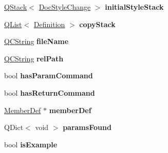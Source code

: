 \begin{DoxyCompactItemize}
\item 
\hypertarget{struct_doc_parser_context_a05ee42b5a2c71142a36b172990976463}{\hyperlink{class_q_stack}{Q\-Stack}$<$ \hyperlink{class_doc_style_change}{Doc\-Style\-Change} $>$ {\bfseries initial\-Style\-Stack}}\label{struct_doc_parser_context_a05ee42b5a2c71142a36b172990976463}

\item 
\hypertarget{struct_doc_parser_context_a1aa0a49fb3b22bcd21ea0482070a2b93}{\hyperlink{class_q_list}{Q\-List}$<$ \hyperlink{class_definition}{Definition} $>$ {\bfseries copy\-Stack}}\label{struct_doc_parser_context_a1aa0a49fb3b22bcd21ea0482070a2b93}

\item 
\hypertarget{struct_doc_parser_context_abb9cd3e430c4eaf05aa259fa96f32305}{\hyperlink{class_q_c_string}{Q\-C\-String} {\bfseries file\-Name}}\label{struct_doc_parser_context_abb9cd3e430c4eaf05aa259fa96f32305}

\item 
\hypertarget{struct_doc_parser_context_afcef5f77de13d4a0ec733abee00e8484}{\hyperlink{class_q_c_string}{Q\-C\-String} {\bfseries rel\-Path}}\label{struct_doc_parser_context_afcef5f77de13d4a0ec733abee00e8484}

\item 
\hypertarget{struct_doc_parser_context_aa4970bcae50388a2d9078bcba282c200}{bool {\bfseries has\-Param\-Command}}\label{struct_doc_parser_context_aa4970bcae50388a2d9078bcba282c200}

\item 
\hypertarget{struct_doc_parser_context_a9afba8003232f0edb180efa072ba13f9}{bool {\bfseries has\-Return\-Command}}\label{struct_doc_parser_context_a9afba8003232f0edb180efa072ba13f9}

\item 
\hypertarget{struct_doc_parser_context_a07ff13b1e1745350150981d8adfab254}{\hyperlink{class_member_def}{Member\-Def} $\ast$ {\bfseries member\-Def}}\label{struct_doc_parser_context_a07ff13b1e1745350150981d8adfab254}

\item 
\hypertarget{struct_doc_parser_context_aca6b99fd844215a27d9356ff04b6b526}{Q\-Dict$<$ void $>$ {\bfseries params\-Found}}\label{struct_doc_parser_context_aca6b99fd844215a27d9356ff04b6b526}

\item 
\hypertarget{struct_doc_parser_context_ad8442db6bd05d7088139591a340045d1}{bool {\bfseries is\-Example}}\label{struct_doc_parser_context_ad8442db6bd05d7088139591a340045d1}


\end{DoxyCompactItemize}
